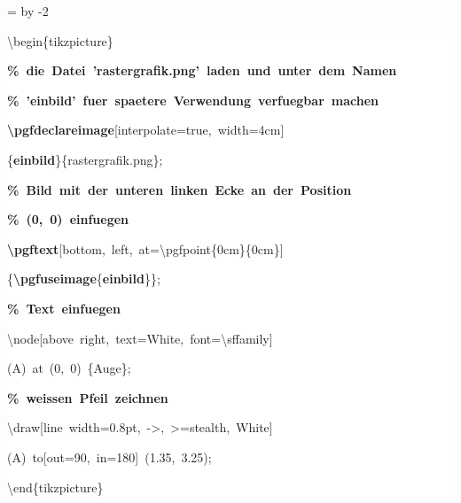 \begingroup
\ttfamily
{}
=\textwidth
\advance{} by -2\fboxsep
\noindent
\colorbox{background}
{%
\parbox{\dimen255}
{%
\rule[-0.5ex]{0pt}{2.5ex}\hspace*{0.0em}\textbackslash{}begin\{tikzpicture\}\\
\rule[-0.5ex]{0pt}{2.5ex}\hspace*{1.0em}\textcolor{G}{\textbf{\%~die~Datei~'rastergrafik.png'~laden~und~unter~dem~Namen}}\\
\rule[-0.5ex]{0pt}{2.5ex}\hspace*{1.0em}\textcolor{G}{\textbf{\%~'einbild'~fuer~spaetere~Verwendung~verfuegbar~machen}}\\
\rule[-0.5ex]{0pt}{2.5ex}\hspace*{1.0em}\textcolor{R}{\textbf{\textbackslash{}pgfdeclareimage}}[interpolate=true,~width=4cm]\\
\rule[-0.5ex]{0pt}{2.5ex}\hspace*{9.0em}\{\textcolor{B}{\textbf{einbild}}\}\{rastergrafik.png\};\\
\rule[-0.5ex]{0pt}{2.5ex}\hspace*{1.0em}\textcolor{G}{\textbf{\%~Bild~mit~der~unteren~linken~Ecke~an~der~Position}}\\
\rule[-0.5ex]{0pt}{2.5ex}\hspace*{1.0em}\textcolor{G}{\textbf{\%~(0,~0)~einfuegen}}\\
\rule[-0.5ex]{0pt}{2.5ex}\hspace*{1.0em}\textcolor{R}{\textbf{\textbackslash{}pgftext}}[bottom,~left,~at=\textbackslash{}pgfpoint\{0cm\}\{0cm\}]\\
\rule[-0.5ex]{0pt}{2.5ex}\hspace*{5.0em}\{\textcolor{R}{\textbf{\textbackslash{}pgfuseimage}}\{\textcolor{B}{\textbf{einbild}}\}\};\\
\rule[-0.5ex]{0pt}{2.5ex}\hspace*{1.0em}\textcolor{G}{\textbf{\%~Text~einfuegen}}\\
\rule[-0.5ex]{0pt}{2.5ex}\hspace*{1.0em}\textbackslash{}node[above~right,~text=White,~font=\textbackslash{}sffamily]\\
\rule[-0.5ex]{0pt}{2.5ex}\hspace*{3.5em}(A)~at~(0,~0)~\{Auge\};\\
\rule[-0.5ex]{0pt}{2.5ex}\hspace*{1.0em}\textcolor{G}{\textbf{\%~weissen~Pfeil~zeichnen}}\\
\rule[-0.5ex]{0pt}{2.5ex}\hspace*{1.0em}\textbackslash{}draw[line~width=0.8pt,~{-}{>},~{>}=stealth,~White]\\
\rule[-0.5ex]{0pt}{2.5ex}\hspace*{3.5em}(A)~to[out=90,~in=180]~(1.35,~3.25);\\
\rule[-0.5ex]{0pt}{2.5ex}\hspace*{0.0em}\textbackslash{}end\{tikzpicture\}}%
}%
\endgroup
